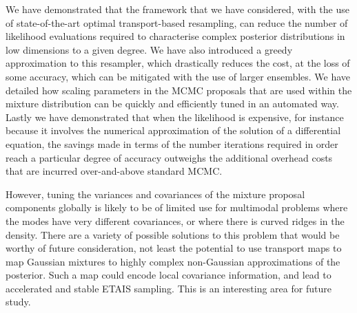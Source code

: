 \documentclass[final]{siamltex}
\begin{document}
We have demonstrated that the framework that we have considered, with
the use of state-of-the-art optimal transport-based resampling, can
reduce the number of likelihood evaluations required to characterise
complex posterior distributions in low dimensions to a given
degree. We have also introduced a greedy approximation to this
resampler, which drastically reduces the cost, at the loss of some
accuracy, which can be mitigated with the use of larger
ensembles. We have detailed how scaling parameters in the MCMC
proposals that are used within the mixture distribution can be quickly
and efficiently
tuned in an automated way. Lastly we have demonstrated that when the
likelihood is expensive, for instance because it involves the
numerical approximation of the solution of a differential equation, the savings made in terms of the number
iterations required in order reach a particular degree of accuracy
outweighs the additional overhead costs that are incurred
over-and-above standard MCMC.

However, tuning the variances and
covariances of the mixture proposal components
globally is likely to be of limited use for multimodal problems where
the modes have very different covariances, or where there is curved
ridges in the density. There are a variety of possible solutions to
this problem that would be worthy of future consideration, not least
the potential to use transport maps\cite{el2012bayesian,parno2014transport} to map Gaussian mixtures to
highly complex non-Gaussian approximations of the posterior. Such a
map could encode local covariance information, and lead to accelerated
and stable ETAIS sampling. This is an interesting area for future study.
\end{document}
